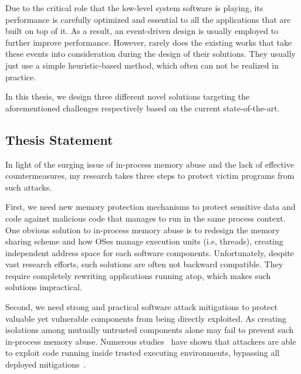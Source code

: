 Due to the critical role that the low-level system software is playing, its performance is carefully optimized and essential to all the applications that are built on top of it. 
As a result, an event-driven design is usually employed to further improve performance. 
However, rarely does the existing works that take these events into consideration during the design of their solutions. 
They usually just use a simple heuristic-based method, which often can not be realized in practice.



In this thesis, we design three different novel solutions targeting the aforementioned challenges respectively based on the current state-of-the-art. 

\subsection{Thesis Statement}

In light of the surging issue of in-process memory abuse and the lack of effective countermeasures, my research takes three steps to protect victim programs from such attacks.

First, we need new memory protection mechanisms to protect sensitive data and code against malicious code that manages to run in the same process context. One obvious solution to in-process memory abuse is to redesign the memory sharing scheme and how OSes manage execution units (i.e, threads), creating independent address space for each software components. Unfortunately, despite vast research efforts, such solutions are often not backward compatible. They require completely rewriting applications running atop, which makes such solutions impractical.

Second, we need strong and practical software attack mitigations to protect valuable yet vulnerable components from being directly exploited. As creating isolations among mutually untrusted components alone may fail to prevent such in-process memory abuse. Numerous studies~\cite{boomerang,tsgx} have shown that attackers are able to exploit code running inside trusted executing environments, bypassing all deployed mitigations~\cite{controljujutsu,jitrop,rop}. 

